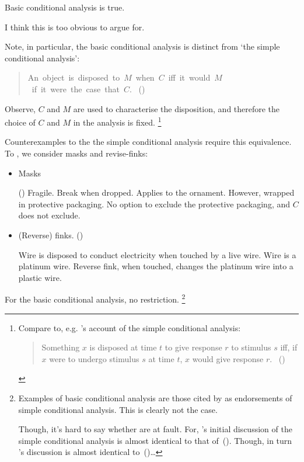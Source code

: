 \begin{note}
  Basic conditional analysis is true.

  I think this is too obvious to argue for.

  Note, in particular, the basic conditional analysis is distinct from `the simple conditional analysis':

  \begin{quote}
    An~object~is~disposed~to~\(M\)~when~\(C\)~iff~it~would~\(M\)~if~it~were~the~case~that~\(C\).\newline
    \mbox{ }\hfill\mbox{(\cite[\S1.2]{Choi:2021wg})}
  \end{quote}

  Observe, \(C\) and \(M\) are used to characterise the disposition, and therefore the choice of \(C\) and \(M\) in the analysis is fixed.%
  \footnote{
    Compare to, e.g. \citeauthor{Lewis:1997wg}'s account of the simple conditional analysis:
    \begin{quote}
    Something \(x\) is disposed at time \(t\) to give response \(r\) to stimulus \(s\) iff, if \(x\) were to undergo stimulus \(s\) at time \(t\), \(x\) would give response \(r\).%
    \mbox{ }\hfill\mbox{(\citeyear[143]{Lewis:1997wg})}
  \end{quote}
  }

  Counterexamples to the the simple conditional analysis require this equivalence.
  To , we consider masks and revise-finks:

  \begin{itemize}
  \item
    Masks

    (\cite{Johnston:1992aa})
    Fragile.
    Break when dropped.
    Applies to the ornament.
    However, wrapped in protective packaging.
    No option to exclude the protective packaging, and \(C\) does not exclude.
  \item
    (Reverse) finks.
    (\cite{Martin:1994aa})

    Wire is disposed to conduct electricity when touched by a live wire.
    Wire is a platinum wire.
    Reverse fink, when touched, changes the platinum wire into a plastic wire.
  \end{itemize}

  For the basic conditional analysis, no restriction.%
  \footnote{
    Examples of basic conditional analysis are those cited by \citeauthor{Choi:2021wg} as endorsements of simple conditional analysis.
    This is clearly not the case.

    Though, it's hard to say whether \citeauthor{Choi:2021wg} are at fault.
    For, \citeauthor{Choi:2021wg}'s initial discussion of the simple conditional analysis is almost identical to that of~(\cite[60]{Manley:2008aa}).
    Though, in turn \citeauthor{Manley:2008aa}'s discussion is almost identical to~(\cite[\S2.1]{Fara:2006aa})\dots

}
\end{note}
